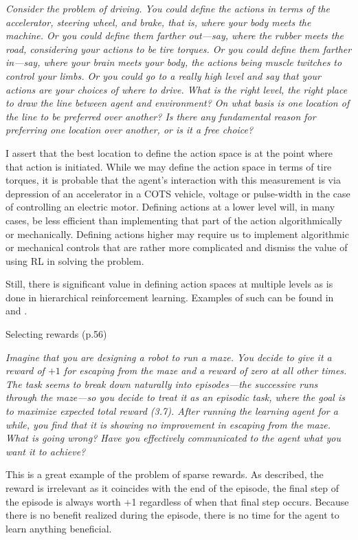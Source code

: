 \documentclass[12pt,letterpaper]{exam}
\begin{document}
\begin{questions}
	\emph{Consider the problem of driving. You could define the actions in terms of the accelerator, 
	steering wheel, and brake, that is, where your body meets the machine. 
	Or you could define them farther out—say, where the rubber meets the road, considering your actions to be tire torques. 
	Or you could define them farther in—say, where your brain meets your body, the actions being muscle twitches to control your limbs. 
	Or you could go to a really high level and say that your actions are your choices of where to drive. 
	What is the right level, the right place to draw the line between agent and environment? 
	On what basis is one location of the line to be preferred over another? 
	Is there any fundamental reason for preferring one location over another, or is it a free choice?}
	\begin{solution}
		I assert that the best location to define the action space is at the point where that action is initiated.
		While we may define the action space in terms of tire torques, it is probable that the agent's interaction with this
		measurement is via depression of an accelerator in a COTS vehicle, voltage or pulse-width in the case of controlling
		an electric motor.
		Defining actions at a lower level will, in many cases, be less efficient than implementing that part of the action 
		algorithmically or mechanically.
		Defining actions higher may require us to implement algorithmic or mechanical controls that are rather more complicated
		and dismiss the value of using RL in solving the problem. 

		Still, there is significant value in defining action spaces at multiple levels as is done in 
		hierarchical reinforcement learning. Examples of such can be found in 
		{\cite{li2023}} and {\cite{shu2017}}.
	\end{solution}

	\setcounter{question}{7-1}%
	\question%
	Selecting rewards (p.56)

	\emph{Imagine that you are designing a robot to run a maze. 
	You decide to give it a reward of \(+1\) for escaping from the maze and a reward of zero at all other times.
	The task seems to break down naturally into episodes—the successive runs through the maze—so you decide to 
	treat it as an episodic task, where the goal is to maximize expected total reward (3.7).
	After running the learning agent for a while, you find that it is showing no improvement in escaping from the maze.
	What is going wrong? Have you effectively communicated to the agent what you want it to achieve?}
	\begin{solution}
		This is a great example of the problem of sparse rewards.
		As described, the reward is irrelevant as it coincides with the end of the episode,
		the final step of the episode is always worth +1 regardless of when that final step occurs.
		Because there is no benefit realized during the episode, there is no time for the agent to learn anything beneficial.


\end{solution}
\end{questions}
\end{document}
